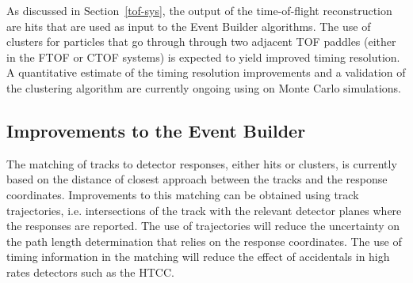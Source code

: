 As discussed in Section~\ref{tof-sys}, the output of the time-of-flight reconstruction are hits that are used
as input to the Event Builder algorithms. The use of clusters for particles that go through through two adjacent
TOF paddles (either in the FTOF or CTOF systems) is expected to yield improved timing resolution. A quantitative
estimate of the timing resolution improvements and a validation of the clustering algorithm are currently ongoing
using on Monte Carlo simulations.

\subsection{Improvements to the Event Builder}

The matching of tracks to detector responses, either hits or clusters, is currently based on the distance of closest
approach between the tracks and the response coordinates. Improvements to this matching can be obtained using
track trajectories, i.e. intersections of the track with the relevant detector planes where the responses are reported.
The use of trajectories will reduce the uncertainty on the path length determination that relies on the response
coordinates. The use of timing information in the matching will reduce the effect of accidentals in high rates detectors
such as the HTCC.



